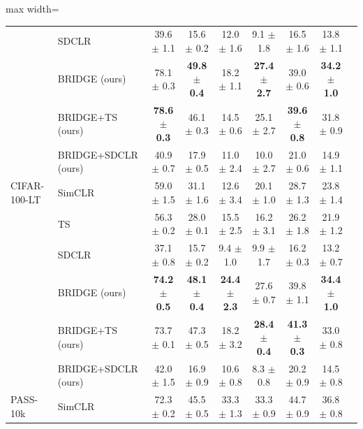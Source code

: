 \begin{table}[t]
\begin{adjustbox}{max width=\textwidth}
\begin{tabular}{l l c c c c c c c}
 & SDCLR & 39.6 {\scriptsize$\pm$ 1.1} & 15.6 {\scriptsize$\pm$ 0.2} & 12.0 {\scriptsize$\pm$ 1.6} & 9.1 {\scriptsize$\pm$ 1.8} & 16.5 {\scriptsize$\pm$ 1.6} & 13.8 {\scriptsize$\pm$ 1.1} \\
 & BRIDGE (ours) & 78.1 {\scriptsize$\pm$ 0.3} & \textbf{49.8 {\scriptsize$\pm$ 0.4}} & 18.2 {\scriptsize$\pm$ 1.1} & \textbf{27.4 {\scriptsize$\pm$ 2.7}} & 39.0 {\scriptsize$\pm$ 0.6} & \textbf{34.2 {\scriptsize$\pm$ 1.0}} \\
 & BRIDGE+TS (ours) & \textbf{78.6 {\scriptsize$\pm$ 0.3}} & 46.1 {\scriptsize$\pm$ 0.3} & 14.5 {\scriptsize$\pm$ 0.6} & 25.1 {\scriptsize$\pm$ 2.7} & \textbf{39.6 {\scriptsize$\pm$ 0.8}} & 31.8 {\scriptsize$\pm$ 0.9} \\
 & BRIDGE+SDCLR (ours) & 40.9 {\scriptsize$\pm$ 0.7} & 17.9 {\scriptsize$\pm$ 0.5} & 11.0 {\scriptsize$\pm$ 2.4} & 10.0 {\scriptsize$\pm$ 2.7} & 21.0 {\scriptsize$\pm$ 0.6} & 14.9 {\scriptsize$\pm$ 1.1} \\
\midrule
CIFAR-100-LT & SimCLR & 59.0 {\scriptsize$\pm$ 1.5} & 31.1 {\scriptsize$\pm$ 1.6} & 12.6 {\scriptsize$\pm$ 3.4} & 20.1 {\scriptsize$\pm$ 1.0} & 28.7 {\scriptsize$\pm$ 1.3} & 23.8 {\scriptsize$\pm$ 1.4} \\
 & TS & 56.3 {\scriptsize$\pm$ 0.2} & 28.0 {\scriptsize$\pm$ 0.1} & 15.5 {\scriptsize$\pm$ 2.5} & 16.2 {\scriptsize$\pm$ 3.1} & 26.2 {\scriptsize$\pm$ 1.8} & 21.9 {\scriptsize$\pm$ 1.2} \\
 & SDCLR & 37.1 {\scriptsize$\pm$ 0.8} & 15.7 {\scriptsize$\pm$ 0.2} & 9.4 {\scriptsize$\pm$ 1.0} & 9.9 {\scriptsize$\pm$ 1.7} & 16.2 {\scriptsize$\pm$ 0.3} & 13.2 {\scriptsize$\pm$ 0.7} \\
 & BRIDGE (ours) & \textbf{74.2 {\scriptsize$\pm$ 0.5}} & \textbf{48.1 {\scriptsize$\pm$ 0.4}} & \textbf{24.4 {\scriptsize$\pm$ 2.3}} & 27.6 {\scriptsize$\pm$ 0.7} & 39.8 {\scriptsize$\pm$ 1.1} & \textbf{34.4 {\scriptsize$\pm$ 1.0}} \\
 & BRIDGE+TS (ours) & 73.7 {\scriptsize$\pm$ 0.1} & 47.3 {\scriptsize$\pm$ 0.5} & 18.2 {\scriptsize$\pm$ 3.2} & \textbf{28.4 {\scriptsize$\pm$ 0.4}} & \textbf{41.3 {\scriptsize$\pm$ 0.3}} & 33.0 {\scriptsize$\pm$ 0.8} \\
 & BRIDGE+SDCLR (ours) & 42.0 {\scriptsize$\pm$ 1.5} & 16.9 {\scriptsize$\pm$ 0.9} & 10.6 {\scriptsize$\pm$ 0.8} & 8.3 {\scriptsize$\pm$ 0.8} & 20.2 {\scriptsize$\pm$ 0.9} & 14.5 {\scriptsize$\pm$ 0.8} \\
\midrule
PASS-10k & SimCLR & 72.3 {\scriptsize$\pm$ 0.2} & 45.5 {\scriptsize$\pm$ 0.5} & 33.3 {\scriptsize$\pm$ 1.3} & 33.3 {\scriptsize$\pm$ 0.9} & 44.7 {\scriptsize$\pm$ 0.9} & 36.8 {\scriptsize$\pm$ 0.8} \\

\end{tabular}
\end{adjustbox}
\end{table}
